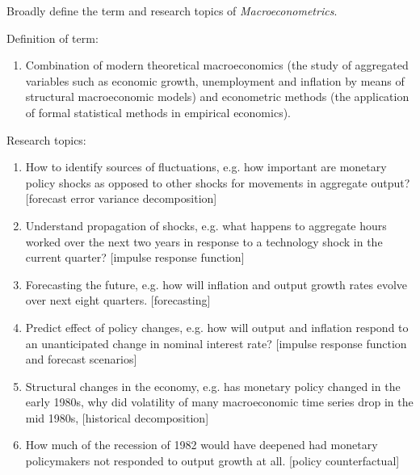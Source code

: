 Broadly define the term and research topics of \emph{Macroeconometrics}.

\begin{sol}
    Definition of term:
    \begin{enumerate}[label=]
        \item Combination of modern theoretical macroeconomics (the study of aggregated variables such as economic growth, unemployment and inflation by means of structural macroeconomic models) and econometric methods (the application of formal statistical methods in empirical economics).
    \end{enumerate}

    Research topics:
    \begin{enumerate}[label=\roman*.]
        \item How to identify sources of fluctuations, e.g. how important are monetary policy shocks as opposed to other shocks for movements in aggregate output? [forecast error variance decomposition]

        \item Understand propagation of shocks, e.g. what happens to aggregate hours worked over the next two years in response to a technology shock in the current quarter? [impulse response function]

        \item Forecasting the future, e.g. how will inflation and output growth rates evolve over next eight quarters. [forecasting]

        \item Predict effect of policy changes, e.g. how will output and inflation respond to an unanticipated change in nominal interest rate? [impulse response function and forecast scenarios]

        \item Structural changes in the economy, e.g. has monetary policy changed in the early 1980s, why did volatility of many macroeconomic time series drop in the mid 1980s, [historical decomposition]

        \item How much of the recession of 1982  would have deepened had monetary policymakers not responded to output growth at all. [policy counterfactual]
    \end{enumerate}
\end{sol}